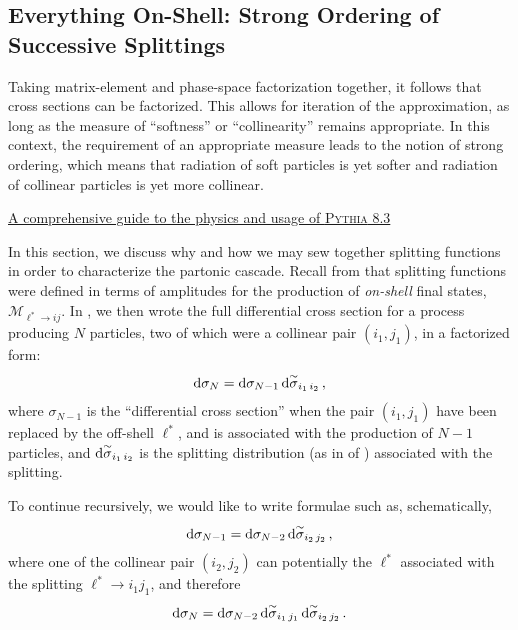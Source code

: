 \subsection{Everything On-Shell: Strong Ordering of Successive Splittings}
\label{sec:everything-on-shell}

\epigraph{Taking matrix-element and phase-space factorization together, it follows that cross sections can be factorized. This allows for iteration of the approximation, as long as the measure of “softness” or “collinearity” remains appropriate. In this context, the requirement of an appropriate measure leads to the notion of strong ordering, which means that radiation of soft particles is yet softer and radiation of collinear particles is yet more collinear.}{\underline{A comprehensive guide to the physics and usage of \textsc{Pythia} 8.3} \cite{Bierlich:2022pfr}}

In this section, we discuss why and how we may sew together splitting functions in order to characterize the partonic cascade.
%
Recall from  that splitting functions were defined in terms of amplitudes for the production of \textit{on-shell} final states, \(\mathcal{M}_{\ell^* \to i j}\).
%
In , we then wrote the full differential cross section for a process producing \(N\) particles, two of which were a collinear pair \((i_1, j_1)\), in a factorized form:
%
\begin{align}
    \dd \sigma_N
    =
    \dd \sigma_{N-1}
    \,
    \dd\overset{\sim}{\sigma}_{i_1\,i_2}
    \,,
\end{align}
where \(\sigma_{N-1}\) is the ``differential cross section'' when the pair \((i_1,j_1)\) have been replaced by the off-shell \(\ell^*\), and is associated with the production of \(N-1\) particles, and \(\dd\overset{\sim}{\sigma}_{i_1\, i_2}\) is the splitting distribution (as in  of ) associated with the splitting.

To continue recursively, we would like to write formulae such as, schematically,
\begin{align}
    \label{eq:cross-section-first-recursion}
    \dd\sigma_{N-1}
    =
    \dd \sigma_{N-2}
    \,
    \dsigmatilde_{i_2 \, j_2}
    \,,
\end{align}
where one of the collinear pair \((i_2, j_2)\) can potentially the \(\ell^*\) associated with the splitting \(\ell^* \to i_1 j_1\), and therefore
\begin{align}
    \dd \sigma_N
    =
    \dd \sigma_{N-2}
    \,
    \dd\overset{\sim}{\sigma}_{i_1 \, j_1}
    \,
    \dd\overset{\sim}{\sigma}_{i_2 \, j_2}
    \,.
\end{align}

